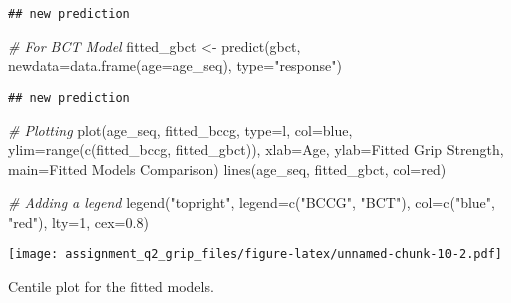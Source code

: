 \documentclass[
]{article}
\newenvironment{Shaded}{\begin{snugshade}}{\end{snugshade}}
\newcommand{\AttributeTok}[1]{\textcolor[rgb]{0.77,0.63,0.00}{#1}}
\newcommand{\CommentTok}[1]{\textcolor[rgb]{0.56,0.35,0.01}{\textit{#1}}}
\newcommand{\DecValTok}[1]{\textcolor[rgb]{0.00,0.00,0.81}{#1}}
\newcommand{\FloatTok}[1]{\textcolor[rgb]{0.00,0.00,0.81}{#1}}
\newcommand{\FunctionTok}[1]{\textcolor[rgb]{0.00,0.00,0.00}{#1}}
\newcommand{\NormalTok}[1]{#1}
\newcommand{\OtherTok}[1]{\textcolor[rgb]{0.56,0.35,0.01}{#1}}
\newcommand{\StringTok}[1]{\textcolor[rgb]{0.31,0.60,0.02}{#1}}
\begin{document}
\begin{verbatim}
## new prediction
\end{verbatim}

\begin{Shaded}
\begin{Highlighting}[]
\CommentTok{\# For BCT Model}
\NormalTok{fitted\_gbct }\OtherTok{\textless{}{-}} \FunctionTok{predict}\NormalTok{(gbct, }\AttributeTok{newdata=}\FunctionTok{data.frame}\NormalTok{(}\AttributeTok{age=}\NormalTok{age\_seq), }\AttributeTok{type=}\StringTok{"response"}\NormalTok{)}
\end{Highlighting}
\end{Shaded}

\begin{verbatim}
## new prediction
\end{verbatim}

\begin{Shaded}
\begin{Highlighting}[]
\CommentTok{\# Plotting}
\FunctionTok{plot}\NormalTok{(age\_seq, fitted\_bccg, }\AttributeTok{type=}\StringTok{\textquotesingle{}l\textquotesingle{}}\NormalTok{, }\AttributeTok{col=}\StringTok{\textquotesingle{}blue\textquotesingle{}}\NormalTok{, }\AttributeTok{ylim=}\FunctionTok{range}\NormalTok{(}\FunctionTok{c}\NormalTok{(fitted\_bccg, fitted\_gbct)),}
     \AttributeTok{xlab=}\StringTok{\textquotesingle{}Age\textquotesingle{}}\NormalTok{, }\AttributeTok{ylab=}\StringTok{\textquotesingle{}Fitted Grip Strength\textquotesingle{}}\NormalTok{, }\AttributeTok{main=}\StringTok{\textquotesingle{}Fitted Models Comparison\textquotesingle{}}\NormalTok{)}
\FunctionTok{lines}\NormalTok{(age\_seq, fitted\_gbct, }\AttributeTok{col=}\StringTok{\textquotesingle{}red\textquotesingle{}}\NormalTok{)}

\CommentTok{\# Adding a legend}
\FunctionTok{legend}\NormalTok{(}\StringTok{"topright"}\NormalTok{, }\AttributeTok{legend=}\FunctionTok{c}\NormalTok{(}\StringTok{"BCCG"}\NormalTok{, }\StringTok{"BCT"}\NormalTok{), }\AttributeTok{col=}\FunctionTok{c}\NormalTok{(}\StringTok{"blue"}\NormalTok{, }\StringTok{"red"}\NormalTok{), }\AttributeTok{lty=}\DecValTok{1}\NormalTok{, }\AttributeTok{cex=}\FloatTok{0.8}\NormalTok{)}
\end{Highlighting}
\end{Shaded}

\texttt{[image: assignment\_q2\_grip\_files/figure-latex/unnamed-chunk-10-2.pdf]}

Centile plot for the fitted models.
\end{document}
